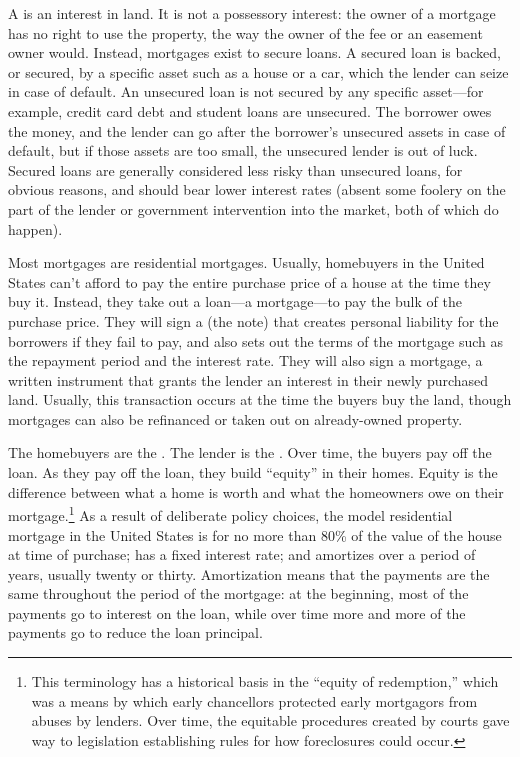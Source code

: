 A  is an interest in land.  It is not a possessory interest: the
owner
of a mortgage has no right to use the property, the way the owner of the fee or
an easement owner would.  Instead, mortgages exist to secure loans.  A secured
loan is backed, or secured, by a specific asset such as a house or a car, which
the lender can seize in case of default.  An unsecured loan is not secured by
any specific asset---for example, credit card debt and student loans are
unsecured.  The borrower owes the money, and the lender can go after the
borrower's unsecured assets in case of default, but if those assets are too
small, the unsecured lender is out of luck.  Secured loans are generally
considered less risky than unsecured loans, for obvious reasons, and should
bear lower interest rates (absent some foolery on the part of the lender or
government intervention into the market, both of which do happen).  

Most mortgages are residential mortgages.  Usually, homebuyers in the United
States can't afford to pay the entire purchase price of a house at the time they
buy it. Instead, they take out a loan---a mortgage---to pay the bulk of the
purchase price.  They will sign a  (the note) that creates
personal liability for the borrowers if they fail to pay, and also sets out the
terms of the mortgage such as the repayment period and the interest rate.  They
will also sign a mortgage, a written instrument that grants the lender an
interest in their newly purchased land.  Usually, this transaction occurs at the
time the buyers buy the land, though mortgages can also be refinanced or taken
out on already-owned property.

The homebuyers are the .  The lender is the
.  Over time, the buyers pay off the loan.  As they pay off
the loan, they build ``equity'' in their homes.  Equity is the difference
between what a home is worth and what the homeowners owe on their
mortgage.\footnote{This terminology has a historical basis in the ``equity of
redemption,'' which was a means by which early chancellors protected early
mortgagors from abuses by lenders.  Over time, the equitable procedures created
by courts gave way to legislation establishing rules for how foreclosures could
occur.}  As a result of deliberate policy choices, the model residential
mortgage in the United States is for no more than 80\% of the value of the house
at time of purchase; has a fixed interest rate; and amortizes over a period of
years, usually twenty or thirty.  Amortization means that the payments are the
same throughout the period of the mortgage: at the beginning, most of the
payments go to interest on the loan, while over time more and more of the
payments go to reduce the loan principal.  

